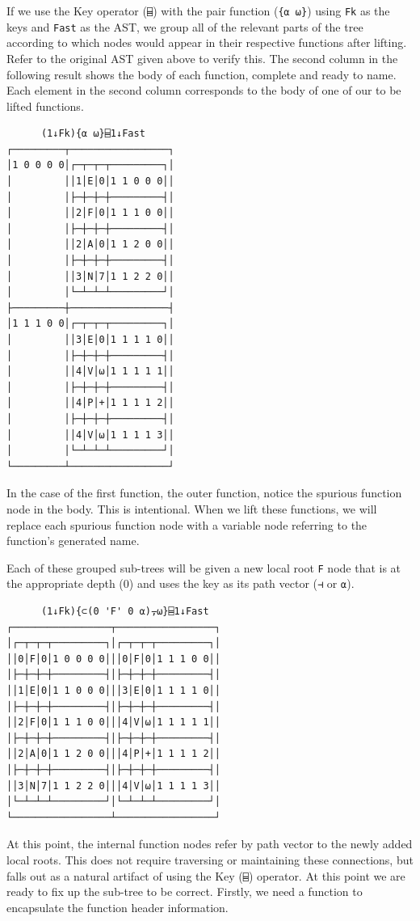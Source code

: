﻿\documentclass[numbers,10pt,preprint]{sigplanconf}
\begin{document}
If we use the Key operator (\verb;⌸;) with the pair function (\verb;{⍺ ⍵};) using \verb;Fk; as the keys and \verb;Fast; as the AST, we group all of the relevant parts of the tree according to which nodes would appear in their respective functions after lifting. Refer to the original AST given above to verify this. The second column in the following result shows the body of each function, complete and ready to name. Each element in the second column corresponds to the body of one of our to be lifted functions. 

\begin{verbatim}
      (1↓Fk){⍺ ⍵}⌸1↓Fast
┌─────────┬─────────────────┐
│1 0 0 0 0│┌─┬─┬─┬─────────┐│
│         ││1│E│0│1 1 0 0 0││
│         │├─┼─┼─┼─────────┤│
│         ││2│F│0│1 1 1 0 0││
│         │├─┼─┼─┼─────────┤│
│         ││2│A│0│1 1 2 0 0││
│         │├─┼─┼─┼─────────┤│
│         ││3│N│7│1 1 2 2 0││
│         │└─┴─┴─┴─────────┘│
├─────────┼─────────────────┤
│1 1 1 0 0│┌─┬─┬─┬─────────┐│
│         ││3│E│0│1 1 1 1 0││
│         │├─┼─┼─┼─────────┤│
│         ││4│V│⍵│1 1 1 1 1││
│         │├─┼─┼─┼─────────┤│
│         ││4│P│+│1 1 1 1 2││
│         │├─┼─┼─┼─────────┤│
│         ││4│V│⍵│1 1 1 1 3││
│         │└─┴─┴─┴─────────┘│
└─────────┴─────────────────┘
\end{verbatim}

In the case of the first function, the outer function, notice the spurious function node in the body. This is intentional. When we lift these functions, we will replace each spurious function node with a variable node referring to the function’s generated name.

Each of these grouped sub-trees will be given a new local root \verb;F; node that is at the appropriate depth (0) and uses the key as its path vector (\verb;⊣; or \verb;⍺;).

\begin{verbatim}
      (1↓Fk){⊂(0 'F' 0 ⍺)⍪⍵}⌸1↓Fast
┌─────────────────┬─────────────────┐
│┌─┬─┬─┬─────────┐│┌─┬─┬─┬─────────┐│
││0│F│0│1 0 0 0 0│││0│F│0│1 1 1 0 0││
│├─┼─┼─┼─────────┤│├─┼─┼─┼─────────┤│
││1│E│0│1 1 0 0 0│││3│E│0│1 1 1 1 0││
│├─┼─┼─┼─────────┤│├─┼─┼─┼─────────┤│
││2│F│0│1 1 1 0 0│││4│V│⍵│1 1 1 1 1││
│├─┼─┼─┼─────────┤│├─┼─┼─┼─────────┤│
││2│A│0│1 1 2 0 0│││4│P│+│1 1 1 1 2││
│├─┼─┼─┼─────────┤│├─┼─┼─┼─────────┤│
││3│N│7│1 1 2 2 0│││4│V│⍵│1 1 1 1 3││
│└─┴─┴─┴─────────┘│└─┴─┴─┴─────────┘│
└─────────────────┴─────────────────┘ 
\end{verbatim}

\noindent At this point, the internal function nodes refer by path vector to the newly added local roots. This does not require traversing or maintaining these connections, but falls out as a natural artifact of using the Key (\verb;⌸;) operator. At this point we are ready to fix up the sub-tree to be correct. Firstly, we need a function to encapsulate the function header information.
\end{document}
